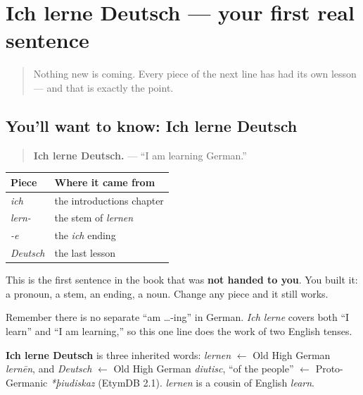 \section[Ich lerne Deutsch]{Ich lerne Deutsch — your first real sentence}

\label{lesson:GE-C05-ich-lerne-deutsch}



\begin{quote}
Nothing new is coming. Every piece of the next line has had its own lesson — and that is exactly the point.
\end{quote}

\subsection*{You'll want to know: Ich lerne Deutsch}
\begin{quote}
\textbf{Ich lerne Deutsch.} — \textquotedblleft{}I am learning German.\textquotedblright{}
\end{quote}

\noindent
\begin{tabularx}{\linewidth}{@{}>{\raggedright\arraybackslash}X>{\raggedright\arraybackslash}X@{}}
\toprule
\textbf{Piece} & \textbf{Where it came from} \\
\midrule
\emph{ich} & the introductions chapter \\
\emph{lern-} & the stem of \emph{lernen} \\
\emph{-e} & the \emph{ich} ending \\
\emph{Deutsch} & the last lesson \\
\bottomrule
\end{tabularx}

This is the first sentence in the book that was \textbf{not handed to you}. You built it: a pronoun, a stem, an ending, a noun. Change any piece and it still works.

Remember there is no separate \textquotedblleft{}am …-ing\textquotedblright{} in German. \emph{Ich lerne} covers both \textquotedblleft{}I learn\textquotedblright{} and \textquotedblleft{}I am learning,\textquotedblright{} so this one line does the work of two English tenses.

\begin{cousinweb}
\textbf{Ich lerne Deutsch} is three inherited words: \emph{lernen} $\leftarrow$ Old High German \emph{lernēn}, and \emph{Deutsch} $\leftarrow$ Old High German \emph{diutisc}, \textquotedblleft{}of the people\textquotedblright{} $\leftarrow$ Proto-Germanic \emph{*þiudiskaz} (EtymDB 2.1). \emph{lernen} is a cousin of English \emph{learn}.
\end{cousinweb}

